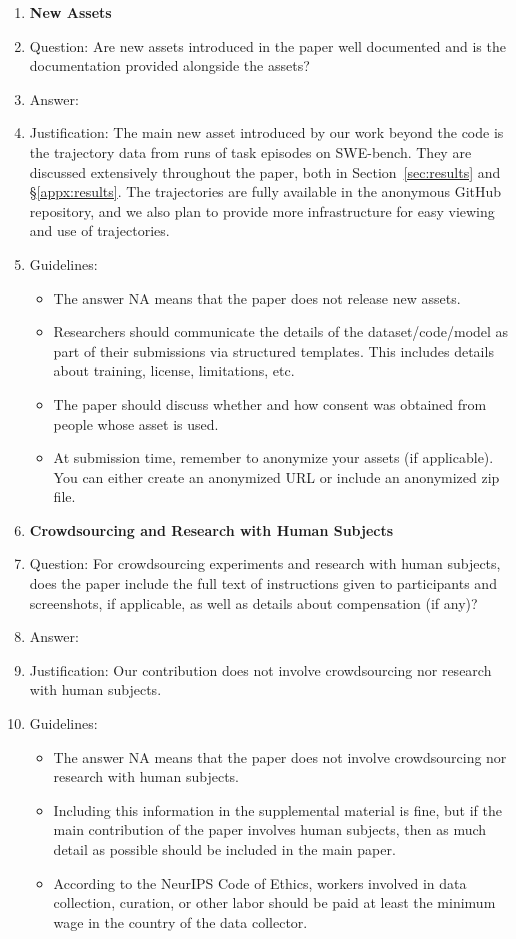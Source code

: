 \begin{enumerate}
\item {\bf New Assets}
    \item[] Question: Are new assets introduced in the paper well documented and is the documentation provided alongside the assets?
    \item[] Answer: \answerYes{}
    \item[] Justification: The main new asset introduced by our work beyond the code is the trajectory data from runs of task episodes on SWE-bench. They are discussed extensively throughout the paper, both in Section~\ref{sec:results} and \S\ref{appx:results}.
    The trajectories are fully available in the anonymous GitHub repository, and we also plan to provide more infrastructure for easy viewing and use of trajectories.
    \item[] Guidelines:
    \begin{itemize}
        \item The answer NA means that the paper does not release new assets.
        \item Researchers should communicate the details of the dataset/code/model as part of their submissions via structured templates. This includes details about training, license, limitations, etc. 
        \item The paper should discuss whether and how consent was obtained from people whose asset is used.
        \item At submission time, remember to anonymize your assets (if applicable). You can either create an anonymized URL or include an anonymized zip file.
    \end{itemize}

\item {\bf Crowdsourcing and Research with Human Subjects}
    \item[] Question: For crowdsourcing experiments and research with human subjects, does the paper include the full text of instructions given to participants and screenshots, if applicable, as well as details about compensation (if any)? 
    \item[] Answer: \answerNA{}
    \item[] Justification: Our contribution does not involve crowdsourcing nor research with human subjects.
    \item[] Guidelines:
    \begin{itemize}
        \item The answer NA means that the paper does not involve crowdsourcing nor research with human subjects.
        \item Including this information in the supplemental material is fine, but if the main contribution of the paper involves human subjects, then as much detail as possible should be included in the main paper. 
        \item According to the NeurIPS Code of Ethics, workers involved in data collection, curation, or other labor should be paid at least the minimum wage in the country of the data collector. 
    \end{itemize}


\end{enumerate}
